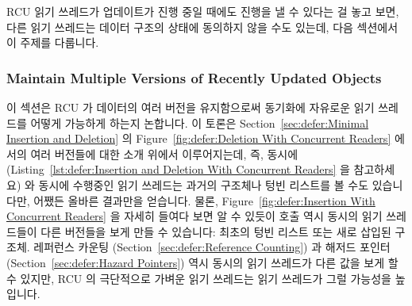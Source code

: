 RCU 읽기 쓰레드가 업데이트가 진행 중일 때에도 진행을 낼 수 있다는 걸 놓고 보면,
다른 읽기 쓰레드는 데이터 구조의 상태에 동의하지 않을 수도 있는데, 다음
섹션에서 이 주제를 다룹니다.

\subsubsection{Maintain Multiple Versions of Recently Updated Objects}
\label{sec:defer:Maintain Multiple Versions of Recently Updated Objects}

이 섹션은 RCU 가 데이터의 여러 버전을 유지함으로써 동기화에 자유로운 읽기
쓰레드를 어떻게 가능하게 하는지 논합니다.
이 토론은
Section~\ref{sec:defer:Minimal Insertion and Deletion} 의
Figure~\ref{fig:defer:Deletion With Concurrent Readers}
에서의 여러 버전들에 대한 소개 위에서 이루어지는데, 즉, 동시에 
(Listing~\ref{lst:defer:Insertion and Deletion With Concurrent Readers} 을
참고하세요) 와 동시에 수행중인 읽기 쓰레드는 과거의  구조체나 텅빈
리스트를 볼 수도 있습니다만, 어쨌든 올바른 결과만을 얻습니다.
물론, Figure~\ref{fig:defer:Insertion With Concurrent Readers} 을 자세히 들여다
보면 알 수 있듯이  호출 역시 동시의 읽기 쓰레드들이 다른
버전들을 보게 만들 수 있습니다: 최초의 텅빈 리스트 또는 새로 삽입된 
구조체.
레퍼런스 카운팅
(Section~\ref{sec:defer:Reference Counting})
과 해저드 포인터
(Section~\ref{sec:defer:Hazard Pointers})
역시 동시의 읽기 쓰레드가 다른 값을 보게 할 수 있지만, RCU 의 극단적으로 가벼운
읽기 쓰레드는 읽기 쓰레드가 그럴 가능성을 높입니다.

